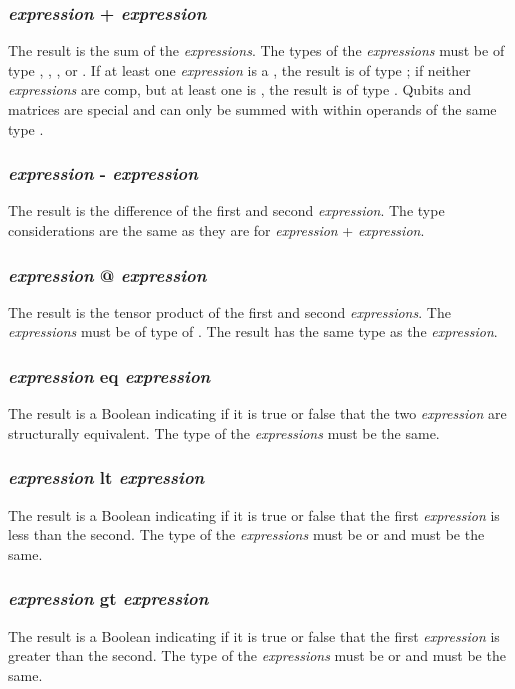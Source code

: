 \subsubsection{\textit{expression} + \textit{expression}}
The result is the sum of the \textit{expressions}. The types of the \textit{expressions} must be of type \integ, \float, \complex, \new{\mat} or \qubit. If at least one \textit{expression} is a \complex, the result is of type \complex; if neither \textit{expressions} are comp, but at least one is \float, the result is of type \float. Qubits and matrices are special and can only be summed with within operands of the same type .
\subsubsection{\textit{expression} - \textit{expression}}
The result is the difference of the first and second \textit{expression}. The type considerations are the same as they are for \textit{expression} + \textit{expression}.
\subsubsection{\textit{expression} @ \textit{expression}}
The result is the tensor product of the first and second \textit{expressions}. The \textit{expressions} must be of type of \mat. The result has the same type as the \textit{expression}.
\subsubsection{\textit{expression} eq \textit{expression}}
The result is a Boolean indicating if it is true or false that the two \textit{expression} are structurally equivalent. The type of the \textit{expressions} must be the same.
\subsubsection{\textit{expression} lt \textit{expression}}
The result is a Boolean indicating if it is true or false that the first \textit{expression} is less than the second. The type of the \textit{expressions} must be \integ or \float and must be the same. 
\subsubsection{\textit{expression} gt \textit{expression}}
The result is a Boolean indicating if it is true or false that the first \textit{expression} is greater than the second. The type of the \textit{expressions} must be \integ or \float and must be the same. 
